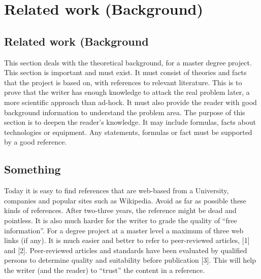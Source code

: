 
\clearpage

\fancyhead{} %

\chapter{Related work (Background)}\thispagestyle{fancy}

\section{Related work (Background}
This section deals with the theoretical background, for a master degree project. This section is important and must exist. It must consist of theories and facts that the project is based on, with references to relevant literature. This is to prove that the writer has enough knowledge to attack the real problem later, a more scientific approach than ad-hock. It must also provide the reader with good background information to understand the problem area. The purpose of this section is to deepen the reader's knowledge. It may include formulas, facts about technologies or equipment. Any statements, formulas or fact must be supported by a good reference.\\

\begin{comment}
To write notes or comments that isn't published in the pdf.
\end{comment}

\section{Something}
Today it is easy to find references that are web-based from a University, companies and popular sites such as Wikipedia. Avoid as far as possible these kinds of references. After two-three years, the reference might be dead and pointless. It is also much harder for the writer to grade the quality of “free information”. For a degree project at a master level a maximum of three web links (if any). It is much easier and better to refer to peer-reviewed articles, [1] and [2]. Peer-reviewed articles and standards have been evaluated by qualified persons to determine quality and suitability before publication [3]. This will help the writer (and the reader) to “trust” the content in a reference.\\

